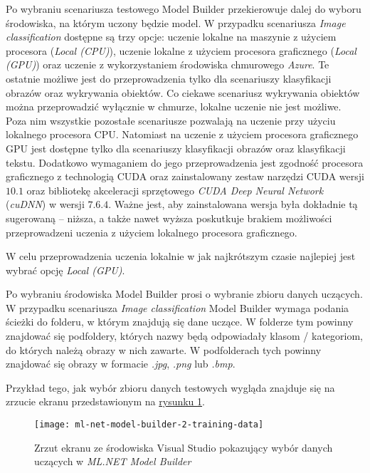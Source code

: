 Po wybraniu scenariusza testowego Model Builder przekierowuje dalej do wyboru środowiska, na którym uczony będzie model.
W przypadku scenariusza \emph{Image classification} dostępne są trzy opcje: uczenie lokalne na maszynie z użyciem procesora (\emph{Local (CPU)}), uczenie lokalne z użyciem procesora graficznego (\emph{Local (GPU)}) oraz uczenie z wykorzystaniem środowiska chmurowego \emph{Azure}.
Te ostatnie możliwe jest do przeprowadzenia tylko dla scenariuszy klasyfikacji obrazów oraz wykrywania obiektów.
Co ciekawe scenariusz wykrywania obiektów można przeprowadzić wyłącznie w chmurze, lokalne uczenie nie jest możliwe.
Poza nim wszystkie pozostałe scenariusze pozwalają na uczenie przy użyciu lokalnego procesora CPU.
Natomiast na uczenie z użyciem procesora graficznego GPU jest dostępne tylko dla scenariuszy klasyfikacji obrazów oraz klasyfikacji tekstu.
Dodatkowo wymaganiem do jego przeprowadzenia jest zgodność procesora graficznego z technologią CUDA oraz zainstalowany zestaw narzędzi CUDA wersji $10.1$ oraz bibliotekę akceleracji sprzętowego \emph{CUDA Deep Neural Network} (\emph{cuDNN}) w wersji $7.6.4$.
Ważne jest, aby zainstalowana wersja była dokładnie tą sugerowaną -- niższa, a także nawet wyższa poskutkuje brakiem możliwości przeprowadzeni uczenia z użyciem lokalnego procesora graficznego.

W celu przeprowadzenia uczenia lokalnie w jak najkrótszym czasie najlepiej jest wybrać opcję \emph{Local (GPU)}.

Po wybraniu środowiska Model Builder prosi o wybranie zbioru danych uczących.
W przypadku scenariusza \emph{Image classification} Model Builder wymaga podania ścieżki do folderu, w którym znajdują się dane uczące.
W folderze tym powinny znajdować się podfoldery, których nazwy będą odpowiadały klasom / kategoriom, do których należą obrazy w nich zawarte.
W podfolderach tych powinny znajdować się obrazy w formacie \emph{.jpg}, \emph{.png} lub \emph{.bmp}.

Przykład tego, jak wybór zbioru danych testowych wygląda znajduje się na zrzucie ekranu przedstawionym na \hyperref[fig:ml-net-model-builder-2-training-data]{rysunku \ref*{fig:ml-net-model-builder-2-training-data}}.

\begin{figure}[ht]
  \texttt{[image: ml-net-model-builder-2-training-data]}
  \caption{Zrzut ekranu ze środowiska Visual Studio pokazujący wybór danych uczących w \emph{ML.NET Model Builder}}
  \label{fig:ml-net-model-builder-2-training-data}
\end{figure}

